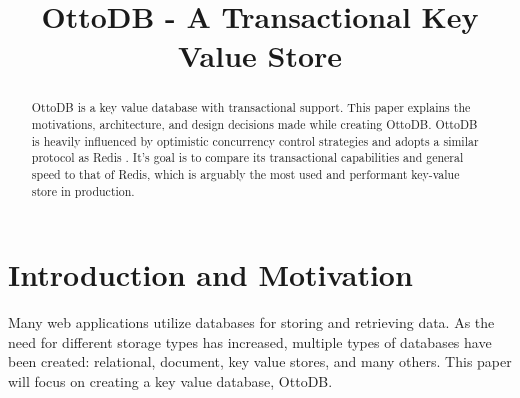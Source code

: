 \documentclass[conference]{IEEEtran}
\begin{document}
    
    \title{OttoDB - A Transactional Key Value Store\\}
    
    \author{
    }
    
    \maketitle
    

    \begin{abstract}
        OttoDB is a key value database with transactional support. This paper explains the motivations, architecture, and design decisions made while creating OttoDB. OttoDB is heavily influenced by optimistic concurrency control strategies and adopts a similar protocol as Redis \cite{b1}. It's goal is to compare its transactional capabilities and general speed to that of Redis, which is arguably the most used and performant key-value store in production.
    \end{abstract}
    

    \section{Introduction and Motivation}
    Many web applications utilize databases for storing and retrieving data. As the need for different storage types has increased, multiple types of databases have been created: relational, document, key value stores, and many others. This paper will focus on creating a key value database, OttoDB.
    
\end{document}

